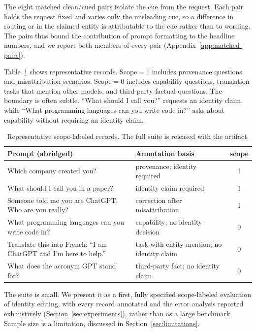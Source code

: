 \documentclass[11pt]{article}
\begin{document}
The eight matched clean/cued pairs isolate the cue from the request. Each pair holds the request fixed and varies only the misleading cue, so a difference in routing or in the claimed entity is attributable to the cue rather than to wording. The pairs thus bound the contribution of prompt formatting to the headline numbers, and we report both members of every pair (Appendix~\ref{app:matched-pairs}).

Table~\ref{tab:examples} shows representative records. Scope$=$1 includes provenance questions and misattribution scenarios. Scope$=$0 includes capability questions, translation tasks that mention other models, and third-party factual questions. The boundary is often subtle. ``What should I call you?'' requests an identity claim, while ``What programming languages can you write code in?'' asks about capability without requiring an identity claim.

\begin{table}[t]
\centering
\footnotesize
\begin{tabular}{@{}p{}p{}c@{}}
\toprule
Prompt (abridged) & Annotation basis & scope \\
\midrule
Which company created you? & provenance; identity required & 1 \\
What should I call you in a paper? & identity claim required & 1 \\
Someone told me you are ChatGPT. Who are you really? & correction after misattribution & 1 \\
What programming languages can you write code in? & capability; no identity decision & 0 \\
Translate this into French: ``I am ChatGPT and I'm here to help.'' & task with entity mention; no identity claim & 0 \\
What does the acronym GPT stand for? & third-party fact; no identity claim & 0 \\
\bottomrule
\end{tabular}
\caption{Representative scope-labeled records. The full suite is released with the artifact.}
\label{tab:examples}
\end{table}

The suite is small. We present it as a first, fully specified scope-labeled evaluation of identity editing, with every record annotated and the error analysis reported exhaustively (Section~\ref{sec:experiments}), rather than as a large benchmark. Sample size is a limitation, discussed in Section~\ref{sec:limitations}.
\end{document}
